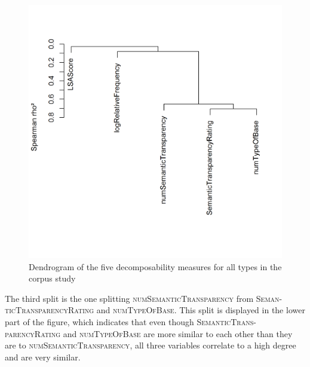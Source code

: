       
     \begin{figure} [t!]
    	\centering
    	\includegraphics[scale=0.5]{images/Corpus/clusterAnalysisDecomposabilityCorpusAllTypes.png}
    	\caption{ Dendrogram of the five decomposability measures for all types in the corpus study}
    	\label{fig:cluster corpus all affixes}
    \end{figure}
      
      
  The third split is the one splitting \textsc{numSemanticTransparency} from \textsc{Seman-ticTransparencyRating} and \textsc{numTypeOfBase}. This split is displayed in the lower part of the figure, which indicates that even though  \textsc{SemanticTrans-parencyRating} and \textsc{numTypeOfBase} are more similar to each other than they are to \textsc{numSemanticTransparency}, all three variables correlate to a high degree and are very similar.
  
